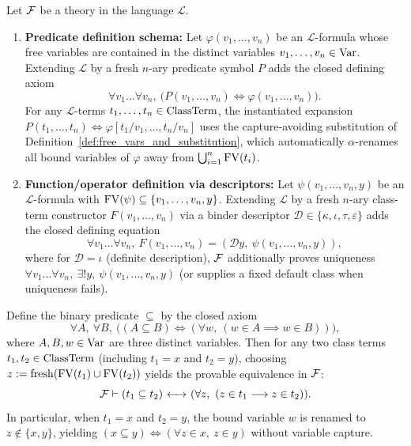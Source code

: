\begin{definition}
\label{def:conservative_extension_by_definition}
Let ${\mathcal{F}}$ be a theory in the language $\mathcal{L}$.
\begin{enumerate}
\item \textbf{Predicate definition schema:} Let $\varphi(v_1, \dots, v_n)$ be an $\mathcal{L}$-formula whose free variables are contained in the distinct variables $v_1, \dots, v_n \in \mathrm{Var}$. Extending $\mathcal{L}$ by a fresh $n$-ary predicate symbol $P$ adds the closed defining axiom
\[
\forall v_1 \dots \forall v_n,\ \big( P(v_1, \dots, v_n) \iff \varphi(v_1, \dots, v_n) \big).
\]
For any $\mathcal{L}$-terms $t_1, \dots, t_n \in {\text{ClassTerm}}$, the instantiated expansion $P(t_1, \dots, t_n) \iff \varphi[t_1/v_1, \dots, t_n/v_n]$ uses the capture-avoiding substitution of Definition~\ref{def:free_vars_and_substitution}, which automatically $\alpha$-renames all bound variables of $\varphi$ away from $\bigcup_{i=1}^n \mathrm{FV}(t_i)$.
\item \textbf{Function/operator definition via descriptors:} Let $\psi(v_1, \dots, v_n, y)$ be an $\mathcal{L}$-formula with $\mathrm{FV}(\psi) \subseteq \{v_1, \dots, v_n, y\}$. Extending $\mathcal{L}$ by a fresh $n$-ary class-term constructor $F(v_1, \dots, v_n)$ via a binder descriptor $\mathcal{D} \in \{\kappa, \iota, \tau, \varepsilon\}$ adds the closed defining equation
\[
\forall v_1 \dots \forall v_n,\ F(v_1, \dots, v_n) = (\mathcal{D} y,\ \psi(v_1, \dots, v_n, y)),
\]
where for $\mathcal{D} = \iota$ (definite description), ${\mathcal{F}}$ additionally proves uniqueness $\forall v_1 \dots \forall v_n,\ \exists! y,\ \psi(v_1, \dots, v_n, y)$ (or supplies a fixed default class when uniqueness fails).
\end{enumerate}
\end{definition}

\begin{proposition}
\label{prop:subclass_bound_variable_resolution}
Define the binary predicate $\subseteq$ by the closed axiom
\[
\forall A,\ \forall B,\ \big( (A \subseteq B) \iff (\forall w,\ (w \in A \implies w \in B)) \big),
\]
where $A, B, w \in \mathrm{Var}$ are three distinct variables. Then for any two class terms $t_1, t_2 \in {\text{ClassTerm}}$ (including $t_1 = x$ and $t_2 = y$), choosing $z := \mathrm{fresh}(\mathrm{FV}(t_1) \cup \mathrm{FV}(t_2))$ yields the provable equivalence in ${\mathcal{F}}$:
\[
{\mathcal{F}} \vdash (t_1 \subseteq t_2) {\ \longleftrightarrow\ } (\forall z,\ (z \in t_1 \longrightarrow z \in t_2)).
\]
In particular, when $t_1 = x$ and $t_2 = y$, the bound variable $w$ is renamed to $z \notin \{x, y\}$, yielding $(x \subseteq y) \iff (\forall z \in x,\ z \in y)$ without variable capture.
\end{proposition}

